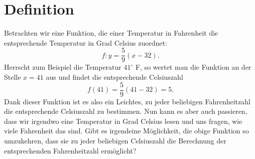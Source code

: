 \documentclass[11pt,oneside]{article}
\begin{document}
\newpage
\section{Definition}
	Betrachten wir eine Funktion, die einer Temperatur in Fahrenheit die entsprechende Temperatur in Grad Celsius zuordnet: \[f:y=\frac{5}{9}(x-32).\] Herrscht zum Beispiel die Temperatur $41^\circ$ F, so wertet man die Funktion an der Stelle $x=41$ aus und findet die entsprechende Celsiuszahl \[f(41)=\frac{5}{9}(41-32)=5.\] Dank dieser Funktion ist es also ein Leichtes, zu jeder beliebigen Fahrenheitzahl die entsprechende Celsiuszahl zu bestimmen.\newline
	Nun kann es aber auch passieren, dass wir irgendwo eine Temperatur in Grad Celsius lesen und uns fragen, wie viele Fahrenheit das sind. Gibt es irgendeine Möglichkeit, die obige Funktion so \flqq umzukehren\frqq, dass sie zu jeder beliebigen Celsiuszahl die Berechnung der entsprechenden Fahrenheitzahl ermöglicht?
\end{document}
